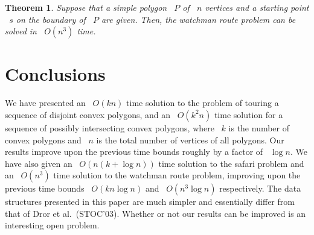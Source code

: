 \documentclass[11pt]{article}
\newtheorem{theorem}{Theorem}
\begin{document}
\begin{theorem}
\label{thm:watchman}
Suppose that a simple polygon ~\(P\) of ~\(n\) vertices and a starting point ~\(s\) on the boundary of ~\(P\) are given. Then, the watchman route problem can be solved in ~\(O(n^3)\) time.
\end{theorem}

\section{Conclusions}
\label{sec:conclusions}

We have presented an ~\(O(kn)\) time solution to the problem of touring a sequence of disjoint convex polygons, and an ~\(O(k^2n)\) time solution for a sequence of possibly intersecting convex polygons, where ~\(k\) is the number of convex polygons and ~\(n\) is the total number of vertices of all polygons.
Our results improve upon the previous time bounds roughly by a factor of ~\(\log n\).
We have also given an ~\(O(n(k+\log n))\) time solution to the safari problem and an ~\(O(n^3)\) time solution to the watchman route problem, improving upon the previous time bounds ~\(O(kn\log n)\) and ~\(O(n^3\log n)\) respectively.
The data structures presented in this paper are much simpler and essentially differ from that of Dror et al.\ (STOC'03).
Whether or not our results can be improved is an interesting open problem.
\end{document}
